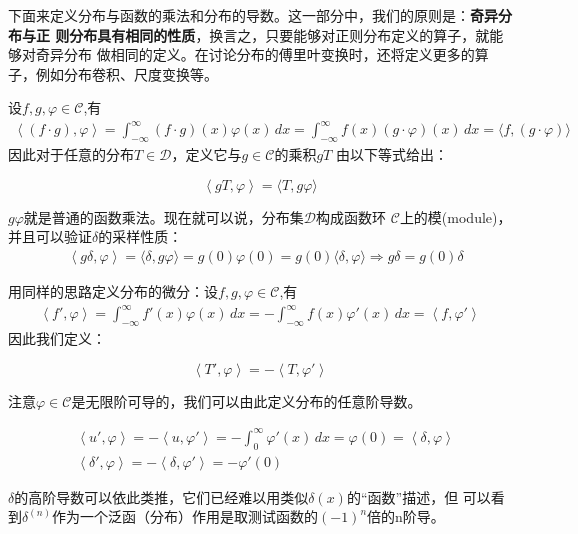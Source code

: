 下面来定义分布与函数的乘法和分布的导数。这一部分中，我们的原则是：\textbf{奇异分布与正
    则分布具有相同的性质}，换言之，只要能够对正则分布定义的算子，就能够对奇异分布
做相同的定义。在讨论分布的傅里叶变换时，还将定义更多的算子，例如分布卷积、尺度变换等。

设$f,g,\varphi\in\mathcal{C} $,有
\begin{align*}
    \left\langle (f\cdot g),\varphi\right\rangle=\int_{-\infty}^{\infty}(f\cdot g)(x)\varphi(x)\,dx=\int_{-\infty}^{\infty}f(x)(g\cdot\varphi)(x)\,dx=\langle f,(g\cdot\varphi)\rangle
\end{align*}
因此对于任意的分布$T\in\mathcal{D} $，定义它与$g\in\mathcal{C} $的乘积$gT$
由以下等式给出：
\begin{definition}[分布与函数的乘法]
    \begin{equation*}
    \left\langle gT,\varphi\right\rangle=\langle T,g\varphi\rangle
\end{equation*}
\end{definition}
$g\varphi$就是普通的函数乘法。现在就可以说，分布集$\mathcal{D} $构成函数环
$\mathcal{C} $上的模(module)，并且可以验证$\delta$的采样性质：
\begin{align*}
     & \left\langle g\delta,\varphi\right\rangle=\langle \delta,g\varphi\rangle=g(0)\varphi(0)=g(0)\langle\delta,\varphi\rangle \Rightarrow  g\delta=g(0)\delta
\end{align*}

用同样的思路定义分布的微分：设$f,g,\varphi\in\mathcal{C} $,有
\begin{align*}
    \left\langle f',\varphi\right\rangle=\int_{-\infty}^{\infty}f'(x)\varphi(x)\,dx=-\int_{-\infty}^{\infty}f(x)\varphi'(x)\,dx=\left\langle f,\varphi'\right\rangle
\end{align*}
因此我们定义：
\begin{definition}[分布的微分]
    \begin{equation*}
    \left\langle T',\varphi\right\rangle=-\left\langle T,\varphi'\right\rangle
\end{equation*}
\end{definition}
注意$\varphi\in\mathcal{C} $是无限阶可导的，我们可以由此定义分布的任意阶导数。
\begin{example}
\begin{align*}
     & \left\langle u',\varphi\right\rangle=-\left\langle u,\varphi'\right\rangle=-\int_{0}^{\infty}\varphi'(x)\,dx=\varphi(0)=\left\langle\delta,\varphi\right\rangle \\
     & \left\langle \delta',\varphi\right\rangle=-\left\langle \delta,\varphi'\right\rangle=-\varphi'(0)
\end{align*}
\end{example}
$\delta$的高阶导数可以依此类推，它们已经难以用类似$\delta(x)$的“函数”描述，但
可以看到$\delta^{(n)}$作为一个泛函（分布）作用是取测试函数的$(-1)^n$倍的n阶导。


